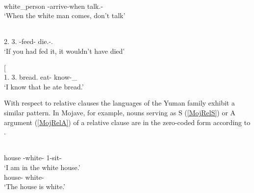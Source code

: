 \begin{exe}\ex\label{WapTempCl}
\begin{xlist}
\ex\gll  {\rm[}  \textipa{tu-lePa-cel'}{\rm]} \\
\dem{} white\_person \dir{}-arrive-when talk.\ipfv{}-\Neg{}\\
\glt `When the white man comes, don't talk' %

\ex\gll  {\rm[}   \textipa{cel'}{\rm]}  \\
2\sg{}.\acc{} 3\sg{}.\acc{} \uop{}-feed-\caus{} \cond{} \opt{} die.\imp{}-\Neg{}.\Hyp{}\\
\glt `If you had fed it, it wouldn't have died' %

\ex\gll{}  {\rm[}\textbf{}  \textipa{paP-tah}{\rm]} \\
1\sg{}.\nom{} 3\sg{}.\acc{} bread.\acc{} eat-\pst{} know-\Non\_\fut{}\\
\glt `I know that he ate bread.' 
\end{xlist}
\end{exe}

With respect to relative clauses the languages of the Yuman family exhibit a similar pattern.
In Mojave, for example, nouns serving as S (\ref{MojRelS}) or A argument (\ref{MojRelA}) of a relative clause are in the zero-coded form according to \citet[187--190]{Munro:1976}.

\begin{exe}\ex\label{MojRelS}
\begin{xlist}
\ex\gll  {\rm[} \textipa{k\super{w}-n\super{y}@m@savc{\rm]}-l\super{y}} \\
house \relativ{}-white-\loc{} 1-sit-\tns{}\\
\glt `I am in the white house.'
\ex\gll {} \\
house-\nom{} white-\tns{}\\
\glt `The house is white.'
\end{xlist}
\end{exe}


